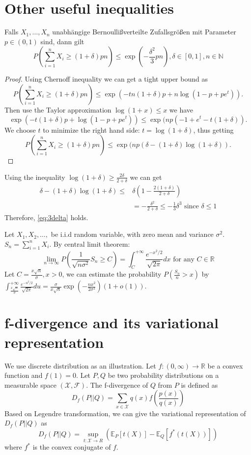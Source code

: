\documentclass{article}
\theoremstyle{definition}
\begin{document}
\section{Other useful inequalities}
Falls $X_1, \dots, X_n$ unabhängige Bernoullißverteilte Zufallsgrößen mit
Parameter $p \in (0,1) $ sind, dann gilt
\begin{equation}\label{eq:3delta}
P(\sum_{i=1}^n X_i \geq (1+ \delta) pn ) \leq \exp(-\frac{\delta^2}{3} pn),
\delta \in [0,1], n \in \mathbb{N}
\end{equation}
\begin{proof}
Using Chernoff inequality we can get a tight upper bound
as
$$
P(\sum_{i=1}^n X_i \geq (1+ \delta) pn )  \leq \exp(-tn(1+\delta) p + n\log(1-p+pe^t)).
$$
Then use the Taylor approximation $\log(1+x) \leq x$ we have
$$
 \exp(-t(1+\delta) p + \log(1-p+pe^t)) \leq \exp(np(-1+e^t - t(1+\delta)).
$$
We choose $t$ to minimize the right hand side: $t=\log(1+\delta)$, thus getting
$$
P(\sum_{i=1}^n X_i \geq (1+ \delta) pn )  \leq \exp(np (\delta - (1+\delta)\log(1+\delta)).
$$
\end{proof}
Using the inequality $\log(1+\delta) \geq \frac{2\delta}{2+\delta} $ we
can get
\begin{align*}
\delta - (1+\delta)\log(1+\delta) \leq & \delta (1-\frac{2(1+\delta)}{2+\delta}) \\
& = -\frac{\delta^2}{2+\delta} \leq -\frac{1}{3} \delta^3 \textrm{ since } \delta \leq 1
\end{align*}
Therefore, \eqref{eq:3delta} holds.

Let $X_1, X_2, \dots, $ be i.i.d random variable, with zero mean and variance $\sigma^2$.
$S_n = \sum_{i=1}^n X_i$.
By central limit theorem:
$$
\lim_{n\to \infty} P(\frac{1}{\sqrt{n\sigma^2}} S_n \geq C) =
\int_{C}^{+\infty} \frac{e^{-x^2/2}}{\sqrt{2\pi}} dx
\textrm{ for any } C \in \mathbb{R}
$$
Let $C=\frac{x\sqrt{n}}{\sigma}, x>0$, we can estimate the probability
$P(\frac{S_n}{n} > x)$ by $\int_{\frac{x\sqrt{n}}{\sigma}}^{+\infty}  \frac{e^{-u^2/2}}{\sqrt{2\pi}}du
= \frac{\sigma}{x\sqrt{n}} \exp(-\frac{nx^2}{2\sigma^2})(1+o(1))$.


\section{ f-divergence and its variational representation}
We use discrete distribution as an illustration.
Let $f:(0,\infty) \to \mathbb{R}$ be a convex function and $f(1)=0$.
Let $P,Q$ be two probability distributions on a measurable space
$(\mathcal{X}, \mathcal{F})$. The f-divergence of $Q$ from $P$
is defined as
\begin{equation}
D_f(P||Q) = \sum_{x\in \mathcal{X}} q(x) f\left(\frac{p(x)}{q(x)}\right)
\end{equation}
Based on Legendre transformation, we can give the variational
representation of $D_f(P||Q)$ as
\begin{equation}\label{eq:Df}
D_f(P||Q) = \sup_{t: \mathcal{X} \to R} \left(\mathbb{E}_P[t(X)] - \mathbb{E}_Q[f^*(t(X))]
\right)
\end{equation}
where $f^*$ is the convex conjugate of $f$.
\end{document}
